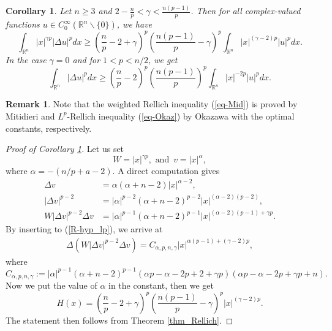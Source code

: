 \documentclass[a4paper,12pt,reqno]{amsart}
\renewcommand\eqref[1]{(\ref{#1})} %
\theoremstyle{theorem}
\numberwithin{equation}{section}
\theoremstyle{plain}
\newtheorem{cor}[thm]{Corollary}
\theoremstyle{definition}
\newtheorem{rem}[thm]{Remark}
\theoremstyle{defi}
\begin{document}
\begin{cor}\label{cor_Rel_p}
	Let $n\geq 3$ and $2 - \frac{n}{p}<\gamma<\frac{n(p-1)}{p}$. Then for all complex-valued functions $u  \in C_0^{\infty} (\mathbb{R}^n\backslash\{0\})$, we have 
	\begin{equation}\label{eq-Mid}
		\int_{\mathbb{R}^n} |x|^{\gamma p} |\Delta u|^p dx \geq \left( \frac{n}{p} -2 + \gamma \right)^p \left( \frac{n(p-1)}{p} -\gamma\right)^p \int_{\mathbb{R}^n}|x|^{(\gamma -2)p} |u|^p dx.
	\end{equation}
	In the case $\gamma=0$ and for $1<p<n/2$, we get 
		\begin{equation}\label{eq-Okaz}
	\int_{\mathbb{R}^n}  |\Delta u|^p dx \geq \left( \frac{n}{p} -2 \right)^p \left( \frac{n(p-1)}{p}\right)^p \int_{\mathbb{R}^n}|x|^{-2p} |u|^p dx.
	\end{equation} 
\end{cor}
\begin{rem}
	Note that the weighted Rellich inequality \eqref{eq-Mid} is proved by Mitidieri \cite{Mitidieri00} and $L^p$-Rellich inequality \eqref{eq-Okaz} by Okazawa \cite{Okazawa} with the optimal constants, respectively.
\end{rem}
\begin{proof}[Proof of Corollary \ref{cor_Rel_p}]
	Let us set 
	\begin{equation}
		W = |x|^{\gamma p} ,\,\, \text{and} \,\,\, v = |x|^{\alpha}, 
	\end{equation}
	where $\alpha = - (n/p +a -2)$. A direct computation gives 
	\begin{align*}
		\Delta v &= \alpha(\alpha + n-2) |x|^{\alpha-2}, \\
		|\Delta v|^{p-2} & = |\alpha|^{p-2}(\alpha + n-2)^{p-2} |x|^{(\alpha-2)(p-2)},\\
		W|\Delta v|^{p-2} \Delta v & = |\alpha|^{p-1} (\alpha + n-2)^{p-1}|x|^{(\alpha-2)(p-1) + \gamma p}.
	\end{align*}
	By inserting to \eqref{R-hyp_lp}, we arrive at 
	\begin{align*}
		\Delta (W|\Delta v|^{p-2} \Delta v) =  C_{\alpha,p,n,\gamma} |x|^{\alpha(p-1)  +(\gamma-2)p },
	\end{align*}
	where 
	$$C_{\alpha,p,n,\gamma}:=|\alpha|^{p-1} (\alpha + n-2)^{p-1}(\alpha p -\alpha -2p +2 + \gamma p) (\alpha p -\alpha -2p + \gamma p +n).$$
	Now we put the value of $\alpha$ in the constant, then we get 
	\begin{equation}
		H(x) = \left( \frac{n}{p} -2 + \gamma \right)^p \left( \frac{n(p-1)}{p} -\gamma\right)^p |x|^{(\gamma -2)p}.
	\end{equation}
	The statement then follows from Theorem \ref{thm_Rellich}.
\end{proof}
\end{document}
